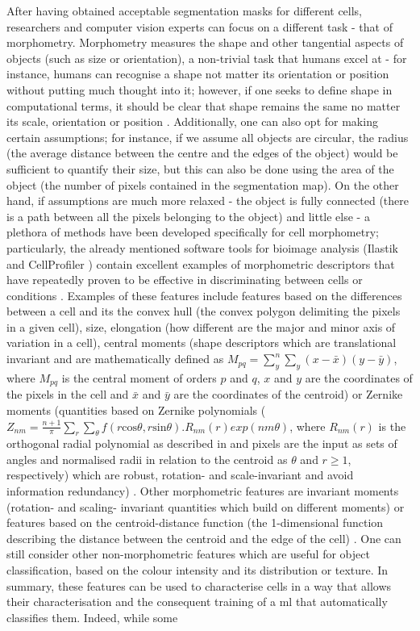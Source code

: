 After having obtained acceptable segmentation masks for different cells, researchers and computer vision experts can focus on a different task - that of morphometry. Morphometry measures the shape and other tangential aspects of objects (such as size or orientation), a non-trivial task that humans excel at - for instance, humans can recognise a shape not matter its orientation or position without putting much thought into it; however, if one seeks to define shape in computational terms, it should be clear that shape remains the same no matter its scale, orientation or position \cite{Kendall1977-yx}. Additionally, one can also opt for making certain assumptions; for instance, if we assume all objects are circular, the radius (the average distance between the centre and the edges of the object) would be sufficient to quantify their size, but this can also be done using the area of the object (the number of pixels contained in the segmentation map). On the other hand, if assumptions are much more relaxed - the object is fully connected (there is a path between all the pixels belonging to the object) and little else - a plethora of methods have been developed specifically for cell morphometry; particularly, the already mentioned software tools for bioimage analysis (Ilastik \cite{Sommer2011-ds} and CellProfiler \cite{Carpenter2006-hy}) contain excellent examples of morphometric descriptors that have repeatedly proven to be effective in discriminating between cells or conditions \cite{Fuchs2010-pk,Gustafsdottir2013-ul, Simm2018-nh}. Examples of these features include features based on the differences between a cell and its the convex hull (the convex polygon delimiting the pixels in a given cell), size, elongation (how different are the major and minor axis of variation in a cell), central moments (shape descriptors which are translational invariant and are mathematically defined as $M_{pq} = \sum_y^n\sum_y(x-\bar{x})(y-\bar{y})$, where $M_{pq}$ is the central moment of orders $p$ and $q$, $x$ and $y$ are the coordinates of the pixels in the cell and $\bar{x}$ and $\bar{y}$ are the coordinates of the centroid) or Zernike moments (quantities based on Zernike polynomials ($Z_{nm} = \frac{n+1}{\pi}\sum_r\sum_{\theta}f(r\mathrm{cos}\theta,r\mathrm{sin}\theta).R_{nm}(r)exp(nm\theta)$, where $R_{nm}(r)$ is the orthogonal radial polynomial as described in \cite{Mingqiang2008-wv} and pixels are the input as sets of angles and normalised radii in relation to the centroid as $\theta$ and $r \ge 1$, respectively) which are robust, rotation- and scale-invariant and avoid information redundancy) \cite{Sommer2011-ds,Carpenter2006-hy}. Other morphometric features are invariant moments (rotation- and scaling- invariant quantities which build on different moments) or features based on the centroid-distance function (the 1-dimensional function describing the distance between the centroid and the edge of the cell) \cite{Mingqiang2008-wv}. One can still consider other non-morphometric features which are useful for object classification, based on the colour intensity and its distribution or texture. In summary, these features can be used to characterise cells in a way that allows their characterisation and the consequent training of a \ac{ml} that automatically classifies them. Indeed, while some 